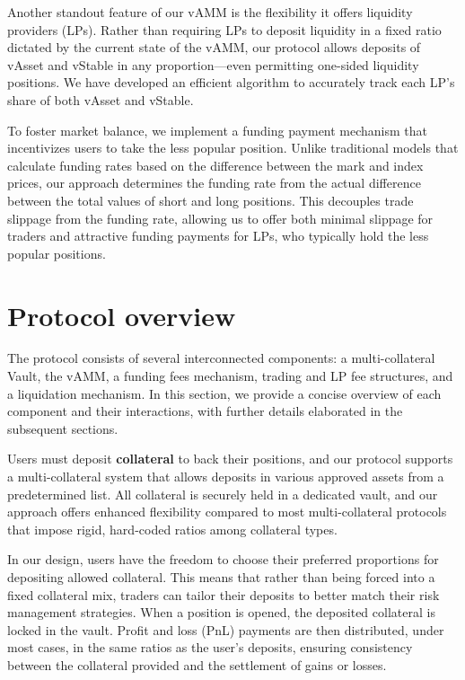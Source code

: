 \documentclass{article}
\begin{document}
Another standout feature of our vAMM is the flexibility it offers liquidity providers (LPs). Rather than requiring LPs to deposit liquidity in a fixed ratio dictated by the current state of the vAMM, our protocol allows deposits of vAsset and vStable in any proportion—even permitting one-sided liquidity positions. We have developed an efficient algorithm to accurately track each LP’s share of both vAsset and vStable.

To foster market balance, we implement a funding payment mechanism that incentivizes users to take the less popular position. Unlike traditional models that calculate funding rates based on the difference between the mark and index prices, our approach determines the funding rate from the actual difference between the total values of short and long positions. This decouples trade slippage from the funding rate, allowing us to offer both minimal slippage for traders and attractive funding payments for LPs, who typically hold the less popular positions.

\section{Protocol overview}

The protocol consists of several interconnected components: a multi-collateral Vault, the vAMM, a funding fees mechanism, trading and LP fee structures, and a liquidation mechanism. In this section, we provide a concise overview of each component and their interactions, with further details elaborated in the subsequent sections.

Users must deposit \textbf{collateral} to back their positions, and our protocol supports a multi-collateral system that allows deposits in various approved assets from a predetermined list. All collateral is securely held in a dedicated vault, and our approach offers enhanced flexibility compared to most multi-collateral protocols that impose rigid, hard-coded ratios among collateral types.

In our design, users have the freedom to choose their preferred proportions for depositing allowed collateral. This means that rather than being forced into a fixed collateral mix, traders can tailor their deposits to better match their risk management strategies. When a position is opened, the deposited collateral is locked in the vault. Profit and loss (PnL) payments are then distributed, under most cases, in the same ratios as the user’s deposits, ensuring consistency between the collateral provided and the settlement of gains or losses.
\end{document}
